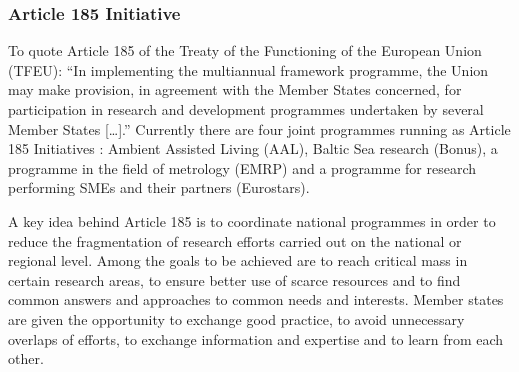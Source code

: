 \documentclass[10pt, plain]{../../metanetpaper}
\begin{document}
\begin{multicols}{2}
%

%

\subsubsection{Article 185 Initiative}
\label{sec:article-185-init}

To quote Article 185 of the Treaty of the Functioning of the European Union (TFEU): ``In implementing the multiannual framework programme, the Union may make provision, in agreement with the Member States concerned, for participation in research and development programmes undertaken by several Member States [\dots].''  Currently there are four joint programmes running as Article 185 Initiatives \cite{A185}: Ambient Assisted Living (AAL), Baltic Sea research (Bonus), a programme in the field of metrology (EMRP) and a programme for research performing SMEs and their partners (Eurostars).

A key idea behind Article 185 is to coordinate national programmes in order to reduce the fragmentation of research efforts carried out on the national or regional level. Among the goals to be achieved are to reach critical mass in certain research areas, to ensure better use of scarce resources and to find common answers and approaches to common needs and interests. Member states are given the opportunity to exchange good practice, to avoid unnecessary overlaps of efforts, to exchange information and expertise and to learn from each other.


\end{multicols}
\end{document}
